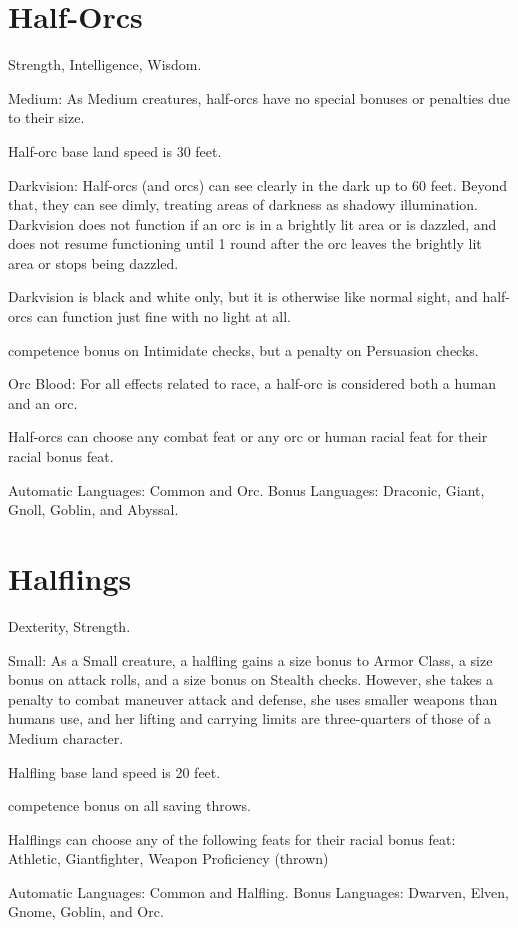 \section{Half-Orcs}
\begin{itemize*}
\item {} Strength,  Intelligence,  Wisdom.
\item Medium: As Medium creatures, half-orcs have no special bonuses or penalties due to their size.
\item Half-orc base land speed is 30 feet.
\item Darkvision: Half-orcs (and orcs) can see clearly in the dark up to 60 feet.  Beyond that, they can see dimly, treating areas of darkness as shadowy illumination. Darkvision does not function if an orc is in a brightly lit area or is dazzled, and does not resume functioning until 1 round after the orc leaves the brightly lit area or stops being dazzled.
\par Darkvision is black and white only, but it is otherwise like normal
sight, and half-orcs can function just fine with no light at all.
\item {} competence bonus on Intimidate checks, but a  penalty on Persuasion checks.
\item Orc Blood: For all effects related to race, a half-orc is considered both a human and an orc.
\item Half-orcs can choose any combat feat or any orc or human racial feat for their racial bonus feat.
\item Automatic Languages: Common and Orc. Bonus Languages: Draconic, Giant, Gnoll, Goblin, and Abyssal.
\end{itemize*}

\section{Halflings}
\begin{itemize*}
\item {} Dexterity,  Strength.
\item Small: As a Small creature, a halfling gains a  size bonus to Armor Class, a  size bonus on attack rolls, and a  size bonus on Stealth checks. However, she takes a  penalty to combat maneuver attack and defense, she uses smaller weapons than humans use, and her lifting and carrying limits are three-quarters of those of a Medium character.
\item Halfling base land speed is 20 feet.
\item {} competence bonus on all saving throws.
\item Halflings can choose any of the following feats for their racial bonus feat: Athletic, Giantfighter, Weapon Proficiency (thrown)
\item Automatic Languages: Common and Halfling. Bonus Languages: Dwarven, Elven, Gnome, Goblin, and Orc.
\end{itemize*}
